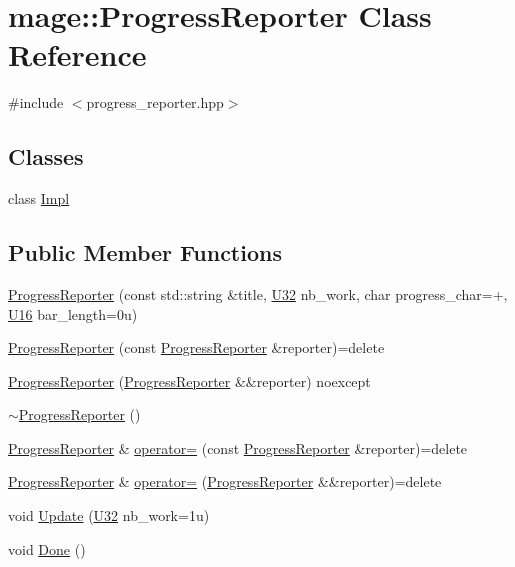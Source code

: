 \hypertarget{classmage_1_1_progress_reporter}{}\section{mage\+:\+:Progress\+Reporter Class Reference}
\label{classmage_1_1_progress_reporter}


{\ttfamily \#include $<$progress\+\_\+reporter.\+hpp$>$}

\subsection*{Classes}
\begin{DoxyCompactItemize}
\item 
class \mbox{\hyperlink{classmage_1_1_progress_reporter_1_1_impl}{Impl}}
\end{DoxyCompactItemize}
\subsection*{Public Member Functions}
\begin{DoxyCompactItemize}
\item 
\mbox{\hyperlink{classmage_1_1_progress_reporter_ab2509fb50a432812fa8ea10c77120387}{Progress\+Reporter}} (const std\+::string \&title, \mbox{\hyperlink{namespacemage_a41c104c036fba3756a74e19f793eeaa1}{U32}} nb\+\_\+work, char progress\+\_\+char=\textquotesingle{}+\textquotesingle{}, \mbox{\hyperlink{namespacemage_af69057eec1ce005c1c3b34ae33486f16}{U16}} bar\+\_\+length=0u)
\item 
\mbox{\hyperlink{classmage_1_1_progress_reporter_a681d23ec19019c04a8a977c4f6f280ea}{Progress\+Reporter}} (const \mbox{\hyperlink{classmage_1_1_progress_reporter}{Progress\+Reporter}} \&reporter)=delete
\item 
\mbox{\hyperlink{classmage_1_1_progress_reporter_a811686b20299f63476c5a5b17c6fa443}{Progress\+Reporter}} (\mbox{\hyperlink{classmage_1_1_progress_reporter}{Progress\+Reporter}} \&\&reporter) noexcept
\item 
\mbox{\hyperlink{classmage_1_1_progress_reporter_aa543239c6dd4474a77cf4cf6904c1b26}{$\sim$\+Progress\+Reporter}} ()
\item 
\mbox{\hyperlink{classmage_1_1_progress_reporter}{Progress\+Reporter}} \& \mbox{\hyperlink{classmage_1_1_progress_reporter_aa98411a059ad0e77ca53d064176f3a86}{operator=}} (const \mbox{\hyperlink{classmage_1_1_progress_reporter}{Progress\+Reporter}} \&reporter)=delete
\item 
\mbox{\hyperlink{classmage_1_1_progress_reporter}{Progress\+Reporter}} \& \mbox{\hyperlink{classmage_1_1_progress_reporter_adfc77427eaff8caf71c1995bf986edc5}{operator=}} (\mbox{\hyperlink{classmage_1_1_progress_reporter}{Progress\+Reporter}} \&\&reporter)=delete
\item 
void \mbox{\hyperlink{classmage_1_1_progress_reporter_aee55b3ced46f7512634b0443ff9807f5}{Update}} (\mbox{\hyperlink{namespacemage_a41c104c036fba3756a74e19f793eeaa1}{U32}} nb\+\_\+work=1u)
\item 
void \mbox{\hyperlink{classmage_1_1_progress_reporter_a11d758647ac2082bc296ab53a7454eaa}{Done}} ()
\end{DoxyCompactItemize}
